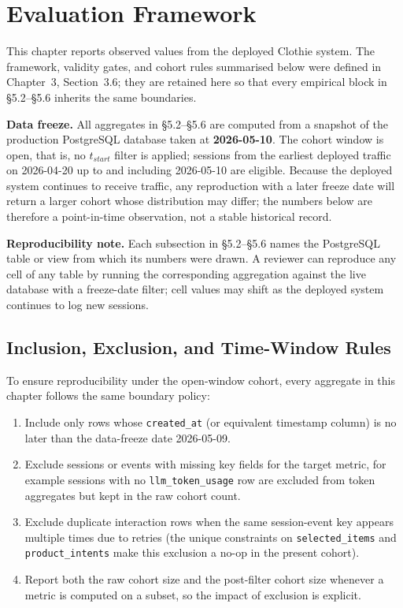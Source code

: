 
\section{Evaluation Framework}
\label{sec:evaluation_framework}

This chapter reports observed values from the deployed Clothie system. The framework, validity gates, and cohort rules summarised below were defined in Chapter~3, Section~3.6; they are retained here so that every empirical block in §5.2--§5.6 inherits the same boundaries.

\textbf{Data freeze.} All aggregates in §5.2--§5.6 are computed from a snapshot of the production PostgreSQL database taken at \textbf{2026-05-10}. The cohort window is open, that is, no $t_{start}$ filter is applied; sessions from the earliest deployed traffic on 2026-04-20 up to and including 2026-05-10 are eligible. Because the deployed system continues to receive traffic, any reproduction with a later freeze date will return a larger cohort whose distribution may differ; the numbers below are therefore a point-in-time observation, not a stable historical record.

\textbf{Reproducibility note.} Each subsection in §5.2--§5.6 names the PostgreSQL table or view from which its numbers were drawn. A reviewer can reproduce any cell of any table by running the corresponding aggregation against the live database with a freeze-date filter; cell values may shift as the deployed system continues to log new sessions.

\subsection{Inclusion, Exclusion, and Time-Window Rules}
\label{subsec:inclusion_exclusion_rules}

To ensure reproducibility under the open-window cohort, every aggregate in this chapter follows the same boundary policy:
\begin{enumerate}
    \item Include only rows whose \texttt{created\_at} (or equivalent timestamp column) is no later than the data-freeze date 2026-05-09.
    \item Exclude sessions or events with missing key fields for the target metric, for example sessions with no \texttt{llm\_token\_usage} row are excluded from token aggregates but kept in the raw cohort count.
    \item Exclude duplicate interaction rows when the same session-event key appears multiple times due to retries (the unique constraints on \texttt{selected\_items} and \texttt{product\_intents} make this exclusion a no-op in the present cohort).
    \item Report both the raw cohort size and the post-filter cohort size whenever a metric is computed on a subset, so the impact of exclusion is explicit.
\end{enumerate}

